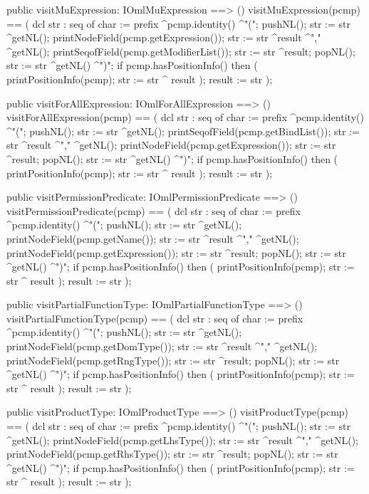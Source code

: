 \begin{vdm_al}
  public visitMuExpression: IOmlMuExpression ==> ()
  visitMuExpression(pcmp) ==
    ( dcl str : seq of char := prefix ^pcmp.identity() ^"(";
      pushNL();
      str := str ^getNL();
      printNodeField(pcmp.getExpression());
      str := str ^result ^"," ^getNL();
      printSeqofField(pcmp.getModifierList());
      str := str ^result;
      popNL();
      str := str ^getNL() ^")";
      if pcmp.hasPositionInfo()
      then ( printPositionInfo(pcmp);
             str := str ^ result );
      result := str );

  public visitForAllExpression: IOmlForAllExpression ==> ()
  visitForAllExpression(pcmp) ==
    ( dcl str : seq of char := prefix ^pcmp.identity() ^"(";
      pushNL();
      str := str ^getNL();
      printSeqofField(pcmp.getBindList());
      str := str ^result ^"," ^getNL();
      printNodeField(pcmp.getExpression());
      str := str ^result;
      popNL();
      str := str ^getNL() ^")";
      if pcmp.hasPositionInfo()
      then ( printPositionInfo(pcmp);
             str := str ^ result );
      result := str );

  public visitPermissionPredicate: IOmlPermissionPredicate ==> ()
  visitPermissionPredicate(pcmp) ==
    ( dcl str : seq of char := prefix ^pcmp.identity() ^"(";
      pushNL();
      str := str ^getNL();
      printNodeField(pcmp.getName());
      str := str ^result ^"," ^getNL();
      printNodeField(pcmp.getExpression());
      str := str ^result;
      popNL();
      str := str ^getNL() ^")";
      if pcmp.hasPositionInfo()
      then ( printPositionInfo(pcmp);
             str := str ^ result );
      result := str );

  public visitPartialFunctionType: IOmlPartialFunctionType ==> ()
  visitPartialFunctionType(pcmp) ==
    ( dcl str : seq of char := prefix ^pcmp.identity() ^"(";
      pushNL();
      str := str ^getNL();
      printNodeField(pcmp.getDomType());
      str := str ^result ^"," ^getNL();
      printNodeField(pcmp.getRngType());
      str := str ^result;
      popNL();
      str := str ^getNL() ^")";
      if pcmp.hasPositionInfo()
      then ( printPositionInfo(pcmp);
             str := str ^ result );
      result := str );

  public visitProductType: IOmlProductType ==> ()
  visitProductType(pcmp) ==
    ( dcl str : seq of char := prefix ^pcmp.identity() ^"(";
      pushNL();
      str := str ^getNL();
      printNodeField(pcmp.getLhsType());
      str := str ^result ^"," ^getNL();
      printNodeField(pcmp.getRhsType());
      str := str ^result;
      popNL();
      str := str ^getNL() ^")";
      if pcmp.hasPositionInfo()
      then ( printPositionInfo(pcmp);
             str := str ^ result );
      result := str );


\end{vdm_al}
